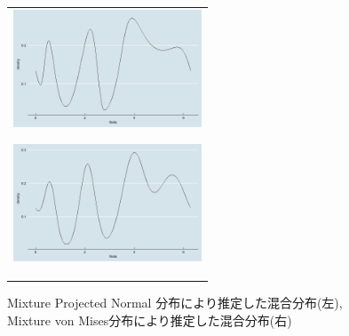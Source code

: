 \documentclass[a4j,11pt]{jarticle}
\begin{document}
\begin{figure}[h]
 \begin{tabular}{c}
\hspace{0.5cm}
 \begin{minipage}{0.5\hsize}
  \begin{center}
   \includegraphics[clip,height= 35mm]{data/mix_pn.png}
  \end{center}
  \label{pnmix}
 \end{minipage}
\hspace{-1.0cm}
 \begin{minipage}{0.5\hsize}
  \begin{center}
   \includegraphics[clip,height= 35mm]{data/mix_von.png}
  \end{center}
  \label{vonmix}
 \end{minipage}
  \end{tabular}
\caption{Mixture Projected Normal 分布により推定した混合分布(左), Mixture von Mises分布により推定した混合分布(右)}
\end{figure}
\fi
\end{document}
